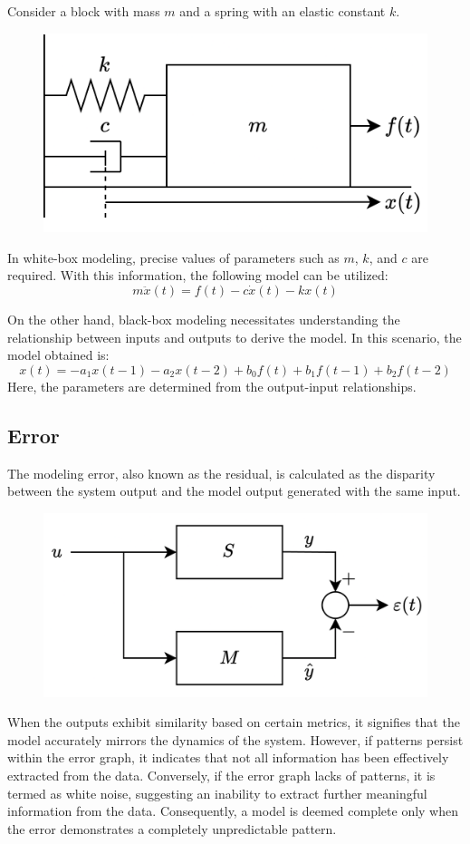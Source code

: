 \begin{example}
    Consider a block with mass $m$ and a spring with an elastic constant $k$. 
    \begin{figure}[H]
        \centering
        \includegraphics[width=0.45\linewidth]{images/system.png}
    \end{figure}
    In white-box modeling, precise values of parameters such as $m$, $k$, and $c$ are required.
    With this information, the following model can be utilized:
    \[m\ddot x(t)=f(t)-c\dot x(t)-kx(t)\]
    
    On the other hand, black-box modeling necessitates understanding the relationship between inputs and outputs to derive the model. 
    In this scenario, the model obtained is: 
    \[x(t)=-a_1x(t-1)-a_2x(t-2)+b_0f(t)+b_1f(t-1)+b_2f(t-2)\]
    Here, the parameters are determined from the output-input relationships.
\end{example}

\subsection{Error}
The modeling error, also known as the residual, is calculated as the disparity between the system output and the model output generated with the same input.
\begin{figure}[H]
    \centering
    \includegraphics[width=0.5\linewidth]{images/error.png}
\end{figure}
When the outputs exhibit similarity based on certain metrics, it signifies that the model accurately mirrors the dynamics of the system. 
However, if patterns persist within the error graph, it indicates that not all information has been effectively extracted from the data. 
Conversely, if the error graph lacks of patterns, it is termed as white noise, suggesting an inability to extract further meaningful information from the data.
Consequently, a model is deemed complete only when the error demonstrates a completely unpredictable pattern.

